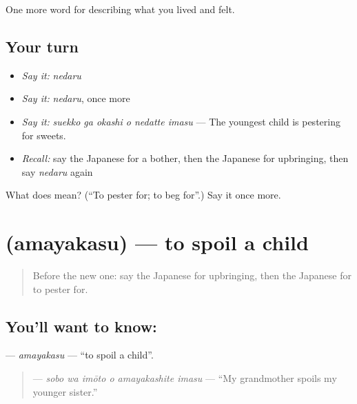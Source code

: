 \begin{grammarlens}[title={What you've built}]
One more word for describing what you lived and felt.
\end{grammarlens}

\subsection*{Your turn}
\begin{itemize}
\raggedright
  \item \emph{Say it:} \emph{nedaru}
  \item \emph{Say it:} \emph{nedaru}, once more
  \item \emph{Say it:} \emph{suekko ga okashi o nedatte imasu} — The youngest child is pestering for sweets.
  \item \emph{Recall:} say the Japanese for a bother, then the Japanese for upbringing, then say \emph{nedaru} again
\end{itemize}

\begin{tcolorbox}[breakable,colback=teal!4,colframe=teal!35!black,title={Before you move on}]
What does  mean? (\textquotedblleft{}To pester for; to beg for\textquotedblright{}.) Say it once more.
\end{tcolorbox}
\section[\texorpdfstring{\ja{あまやかす} (amayakasu)}{あまやかす (amayakasu)}]{ (amayakasu) — to spoil a child}

\label{lesson:JA-C478-amayakasu}



\begin{quote}
Before the new one: say the Japanese for upbringing, then the Japanese for to pester for.
\end{quote}

\subsection*{You'll want to know: }
\textbf{} — \emph{amayakasu} — \textquotedblleft{}to spoil a child\textquotedblright{}.

\begin{quote}
\textbf{  } — \emph{sobo wa imōto o amayakashite imasu} — \textquotedblleft{}My grandmother spoils my younger sister.\textquotedblright{}
\end{quote}

